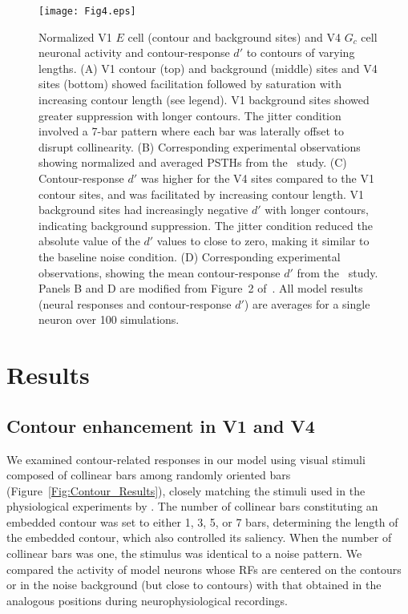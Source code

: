 {\begin{figure*}
\begin{center}
\texttt{[image: Fig4.eps]}
\end{center}
\caption{Normalized V1 $E$ cell (contour and background sites) and V4
  $G_c$ cell neuronal activity and contour-response $d'$ to contours of
  varying lengths. (A) V1 contour (top) and background (middle) sites
  and V4 sites (bottom) showed facilitation followed by saturation
  with increasing contour length (see legend). V1 background sites
  showed greater suppression with longer contours. The jitter
  condition involved a 7-bar pattern where each bar was laterally
  offset to disrupt collinearity. (B) Corresponding experimental
  observations showing normalized and averaged PSTHs from
  the~\cite{Chen_etal14} study. 
  (C) Contour-response $d'$ was higher for the V4
  sites compared to the V1 contour sites, and was facilitated by
  increasing contour length. V1 background sites had increasingly
  negative $d'$ with longer contours, indicating background
  suppression. The jitter condition reduced the absolute value of the
  $d'$ values to close to zero, making it similar to the baseline
  noise condition. (D) Corresponding experimental observations,
  showing the mean contour-response $d'$ from the~\cite{Chen_etal14}
  study. 
  Panels B and D are modified from Figure~2 of~\cite{Chen_etal14}.
  All model results (neural responses and contour-response $d'$) are
  averages for a single neuron over 100 simulations.
}
\label{Fig:Neural_responses}
\end{figure*}

\section{Results}
\label{sec:results}
\subsection{Contour enhancement in V1 and V4}
We examined contour-related responses in our model using visual
stimuli composed of collinear bars among randomly oriented bars
(Figure~\ref{Fig:Contour_Results}), closely matching the stimuli used
in the physiological experiments by \cite{Chen_etal14}. The number of
collinear bars constituting an embedded contour
was set to either 1, 3, 5, or 7 bars, 
determining the length
of the embedded contour, 
which also controlled its saliency.
When the number of collinear bars was one, the stimulus was identical to a
noise pattern. We compared the activity of model neurons
whose RFs are centered on the contours 
or in the noise background (but close to contours)
with that obtained in the analogous positions during
neurophysiological recordings.

}
